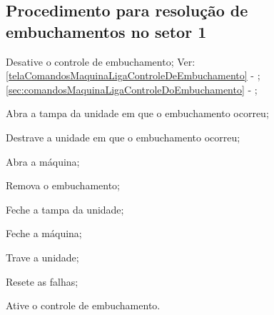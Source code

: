 \ifmachineType
  \newpage
  \thispagestyle{fancy}
  \vspace*{40 pt}
\fi

\subsection{Procedimento para resolução de embuchamentos no setor 1}



\begin{procedureFixingIsuesSector1}

  \item[\ding{\dingNumber}] Desative o controle de embuchamento; Ver: 
  \ifmachineType
  \ref{telaComandosMaquinaLigaControleDeEmbuchamento} - ;
  \else
  \ref{sec:comandosMaquinaLigaControleDoEmbuchamento} - ;
  \fi
  \ifmachineType
  \item[\ding{\dingNumber}] Abra a tampa da unidade em que o embuchamento ocorreu;
  \else
  \item[\ding{\dingNumber}] Destrave a unidade em que o embuchamento ocorreu;
  \item[\ding{\dingNumber}] Abra a máquina;
  \fi
  \item[\ding{\dingNumber}] Remova o embuchamento;
  \ifmachineType
  \item[\ding{\dingNumber}] Feche a tampa da unidade;
  \else
  \item[\ding{\dingNumber}] Feche a máquina;
  \item[\ding{\dingNumber}] Trave a unidade;
  \fi
  \item[\ding{\dingNumber}] Resete as falhas;
  \item[\ding{\dingNumber}] Ative o controle de embuchamento.
  
\end{procedureFixingIsuesSector1}



